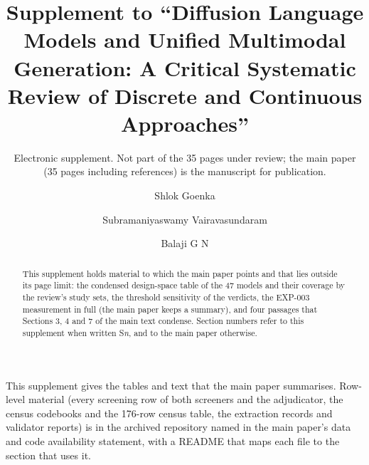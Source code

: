 \documentclass[acmsmall,screen]{acmart}
\begin{document}
\title[Supplement to the review of diffusion language models]{Supplement to ``Diffusion Language Models and Unified Multimodal Generation: A Critical Systematic Review of Discrete and Continuous Approaches''}
\subtitle{Electronic supplement. Not part of the 35 pages under review; the main paper (35 pages including references) is the manuscript for publication.}

\author{Shlok Goenka}
\author{Subramaniyaswamy Vairavasundaram}
\author{Balaji G N}

\begin{abstract}
This supplement holds material to which the main paper points and that lies outside its page limit: the condensed design-space table of the 47 models and their coverage by the review's study sets, the threshold sensitivity of the verdicts, the EXP-003 measurement in full (the main paper keeps a summary), and four passages that Sections 3, 4 and 7 of the main text condense. Section numbers refer to this supplement when written S\textit{n}, and to the main paper otherwise.
\end{abstract}

\maketitle

This supplement gives the tables and text that the main paper summarises. Row-level material (every screening row of both screeners and the adjudicator, the census codebooks and the 176-row census table, the extraction records and validator reports) is in the archived repository named in the main paper's data and code availability statement, with a README that maps each file to the section that uses it.

\setcounter{section}{0}
\end{document}
